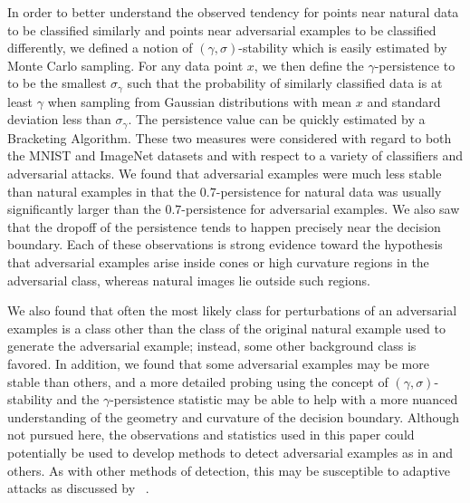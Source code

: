 In order to better understand the observed tendency for points near natural data to be classified similarly and points near
adversarial examples to be classified differently, we defined a notion of $(\gamma,\sigma)$-stability which is easily estimated by Monte Carlo sampling. For any data point $x$, we then define the $\gamma$-persistence to to be the smallest $\sigma_\gamma$ such that the probability of similarly classified data is at least $\gamma$ when sampling from Gaussian distributions with mean $x$ and standard deviation less than $\sigma_\gamma$. The persistence value can be quickly estimated by a Bracketing Algorithm. These two measures were considered with regard to both the MNIST and ImageNet datasets and with respect to a variety of classifiers and adversarial attacks. We found that adversarial examples were much less stable than natural examples in that the $0.7$-persistence for natural data was usually significantly larger than the $0.7$-persistence for adversarial examples. We also saw that the dropoff of the persistence tends to happen precisely near the decision boundary. Each of these observations is strong evidence toward the hypothesis that adversarial examples arise inside cones or high curvature regions in the adversarial class, whereas natural images lie outside such regions.

We also found that often the most likely class for perturbations of an adversarial examples is a class other than the class of the original natural example used to generate the adversarial example; instead, some other background class is favored. In addition, we found that some adversarial examples may be more stable than others, and a more detailed probing using the concept of $(\gamma,\sigma)$-stability and the $\gamma$-persistence statistic may be able to help with a more nuanced understanding of the geometry and curvature of the decision boundary. Although not pursued here, the observations and statistics used in this paper could potentially be used to develop methods to detect adversarial examples as in \citep{crecchi2019,frosst2018,hosseini2019odds,Lee2018ASU,qin2020,roth19aodds} and others. As with other methods of detection, this may be susceptible to adaptive attacks as discussed by ~\citet{tramer2020adaptive}.

